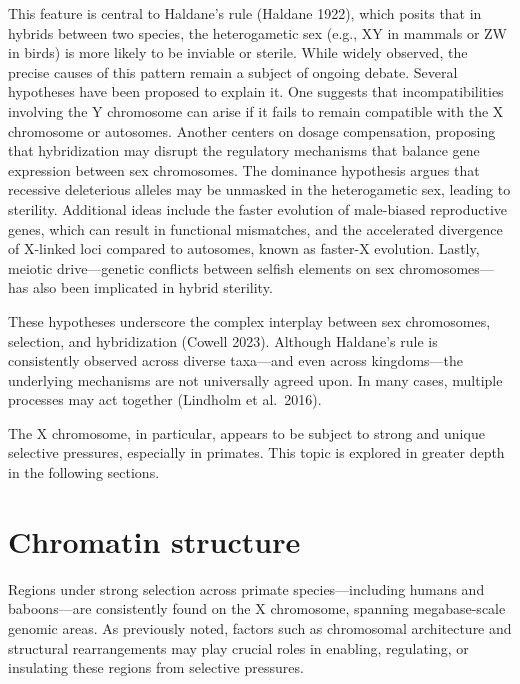 \documentclass[
  a4paper,
  openany]{scrbook}
\begin{document}
This feature is central to Haldane's rule \cite{Haldane1922} (Haldane
1922), which posits that in hybrids between two species, the
heterogametic sex (e.g., XY in mammals or ZW in birds) is more likely to
be inviable or sterile. While widely observed, the precise causes of
this pattern remain a subject of ongoing debate. Several hypotheses have
been proposed to explain it. One suggests that incompatibilities
involving the Y chromosome can arise if it fails to remain compatible
with the X chromosome or autosomes. Another centers on dosage
compensation, proposing that hybridization may disrupt the regulatory
mechanisms that balance gene expression between sex chromosomes. The
dominance hypothesis argues that recessive deleterious alleles may be
unmasked in the heterogametic sex, leading to sterility. Additional
ideas include the faster evolution of male-biased reproductive genes,
which can result in functional mismatches, and the accelerated
divergence of X-linked loci compared to autosomes, known as faster-X
evolution. Lastly, meiotic drive---genetic conflicts between selfish
elements on sex chromosomes---has also been implicated in hybrid
sterility.

These hypotheses underscore the complex interplay between sex
chromosomes, selection, and hybridization \cite{Cowell2023} (Cowell
2023). Although Haldane's rule is consistently observed across diverse
taxa---and even across kingdoms---the underlying mechanisms are not
universally agreed upon. In many cases, multiple processes may act
together \cite{Lindholm2016} (Lindholm et al.~2016).

The X chromosome, in particular, appears to be subject to strong and
unique selective pressures, especially in primates. This topic is
explored in greater depth in the following sections.

\section{Chromatin structure}\label{chromatin-structure}

Regions under strong selection across primate species---including humans
and baboons---are consistently found on the X chromosome, spanning
megabase-scale genomic areas. As previously noted, factors such as
chromosomal architecture and structural rearrangements may play crucial
roles in enabling, regulating, or insulating these regions from
selective pressures.
\end{document}
